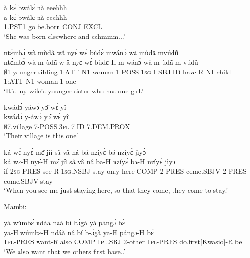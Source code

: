 \begin{exe} 
\exC\label{147} 
  \glll  à kɛ́ bwálɛ̀ nà eeehhh  \\
          a kɛ́ bwálɛ nà eeehhh \\
          1.PST1 go be.born CONJ EXCL  \\
    \trans `She was born elsewhere and eehmmm...'
\end{exe}

\begin{exe} 
\exC\label{148} 
  \glll ntɛ́mbɔ̀ wà mùdã̂ wã̂ nyɛ̀ wɛ́ bùdɛ́ mwánɔ̀ wà mùdã̂ mvúdũ̂ \\
       ntɛ́mbɔ̀ wà m-ùdã̂ w-ã̂ nyɛ wɛ́ bùdɛ-H m-wánɔ̀ wà m-ùdã̂ m-vúdũ̂ \\
        $\emptyset$1.younger.sibling 1:ATT N1-woman 1-POSS.1\textsc{sg} 1.SBJ ID have-R N1-child 1:ATT N1-woman 1-one    \\
    \trans `It's my wife's younger sister who has one girl.'
\end{exe}

\begin{exe} 
\exC\label{149} 
  \glll  kwádɔ́ yáwɔ̀ yɔ̂ wɛ́ yî \\
          kwádɔ́ y-áwɔ̀ yɔ̂ wɛ́ yî \\
         $\emptyset$7.village 7-POSS.3\textsc{pl} 7 ID 7.DEM.PROX   \\
    \trans `Their village is this one.'
\end{exe}

\begin{exe} 
\exC\label{150}
  \glll  ká wɛ́ nyɛ́ mɛ̂ jíì sâ vâ nâ bá nzíyɛ̀ bá nzíyɛ̀ jìyɔ̀ \\
       ká wɛ-H nyɛ̂-H mɛ̂ jíì sâ vâ nâ ba-H nzíyɛ̀ ba-H nzíyɛ̀ jìyɔ \\
         if 2\textsc{sg}-PRES see-R 1\textsc{sg}.NSBJ stay only here COMP 2-PRES come.SBJV 2-PRES come.SBJV stay   \\
    \trans `When you see me just staying here, so that they come, they come to stay.'
\end{exe}

\noindent Mambi:

\begin{exe} 
\exC\label{151} 
  \glll  yá wúmbɛ́ ndáà náà bí bɔ́gà yá pángɔ́ bɛ̀ \\
         ya-H wúmbɛ-H ndáà nâ bí b-ɔ́gà ya-H pángɔ-H bɛ̀ \\
        1\textsc{pl}-PRES want-R also COMP 1\textsc{pl}.SBJ 2-other 1\textsc{pl}-PRES  do.first[Kwasio]-R be  \\
    \trans `We also want that we others first have..'
\end{exe}


